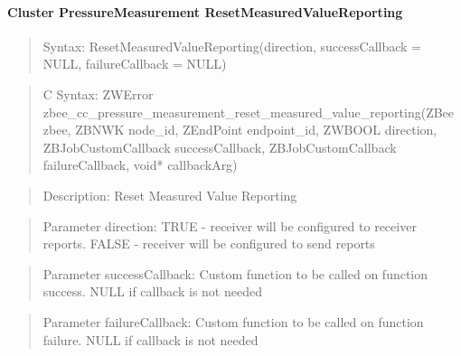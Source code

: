 \paragraph{Cluster PressureMeasurement ResetMeasuredValueReporting}
\begin{quote}Syntax: ResetMeasuredValueReporting(direction, successCallback = NULL, failureCallback = NULL)\end{quote}
\begin{quote}C Syntax: ZWError zbee\_cc\_pressure\_measurement\_reset\_measured\_value\_reporting(ZBee zbee, ZBNWK node\_id, ZEndPoint endpoint\_id, ZWBOOL direction, ZBJobCustomCallback successCallback, ZBJobCustomCallback failureCallback, void* callbackArg)\end{quote}
\begin{quote}Description: Reset Measured Value Reporting\end{quote}
\begin{quote}Parameter direction: TRUE  - receiver will be configured to receiver reports. FALSE - receiver will be configured to send reports\end{quote}
\begin{quote}Parameter successCallback: Custom function to be called on function success. NULL if callback is not needed\end{quote}
\begin{quote}Parameter failureCallback: Custom function to be called on function failure. NULL if callback is not needed\end{quote}


